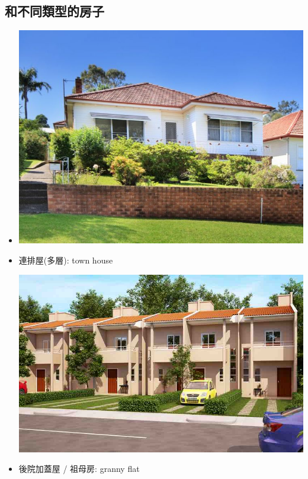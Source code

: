 \subsection{和不同類型的房子}
\begin{multicols}{2}
\begin{itemize}
  \itemsep0em
  \item {}
  \begin{center}
    \includegraphics[scale=0.4]{pics/house}
  \end{center}
  \item 連排屋(多層): town house
  \begin{center}
    \includegraphics[scale=0.3]{pics/townhouse}
  \end{center}
  \item 後院加蓋屋 / 祖母房: granny flat
  \begin{center}

\end{center}
\end{itemize}
\end{multicols}
